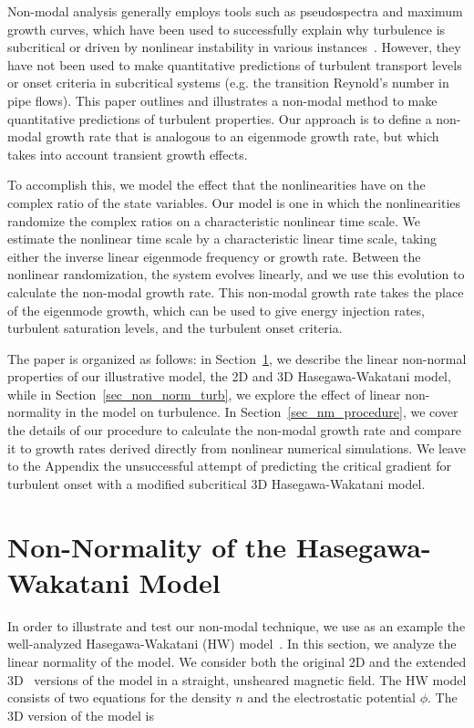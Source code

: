 \documentclass[twocolumn,showkeys,superscriptaddress]{revtex4}
\begin{document}
Non-modal analysis generally employs tools such as pseudospectra and maximum growth curves, which have been used to successfully explain
why turbulence is subcritical or driven by nonlinear instability in various instances~\cite{trefethen1993,camargo1998}. 
However, they have not been used to make quantitative predictions of turbulent transport levels or onset criteria in subcritical systems (e.g. the transition Reynold's number in pipe flows).
This paper outlines and illustrates a non-modal method to make quantitative predictions of turbulent properties. 
Our approach is to define a non-modal growth rate that is analogous to an eigenmode growth rate, but which takes into account transient growth effects. 

To accomplish this, we model the effect that the nonlinearities have on the complex ratio of the state variables. Our model is one in which the 
nonlinearities randomize the complex ratios on a characteristic nonlinear time scale.
We estimate the nonlinear time scale by a characteristic linear time scale, taking either the inverse linear eigenmode frequency or growth rate.
Between the nonlinear randomization, the system evolves linearly, and we use this evolution to calculate the non-modal growth rate. 
This non-modal growth rate takes the place of the eigenmode growth, which can be used
to give energy injection rates, turbulent saturation levels, and the turbulent onset criteria.

The paper is organized as follows: in Section~\ref{sec_hw_model}, we describe the linear non-normal properties of our illustrative model, the 2D and 3D Hasegawa-Wakatani model,
while in Section~\ref{sec_non_norm_turb}, we explore the effect of linear non-normality in the model on turbulence. 
In Section~\ref{sec_nm_procedure}, we cover the details of our procedure to calculate the non-modal growth rate and compare it to growth rates derived directly from nonlinear numerical simulations. 
We leave to the Appendix the unsuccessful attempt of predicting the critical gradient for turbulent onset with a modified subcritical 3D Hasegawa-Wakatani model.

\section{Non-Normality of the Hasegawa-Wakatani Model} 
\label{sec_hw_model}

In order to illustrate and test our non-modal technique, we use as an example the well-analyzed Hasegawa-Wakatani (HW) model~\cite{hasegawa1983}.
In this section, we analyze the linear normality of the model.
We consider both the original 2D and the extended 3D~\cite{biskamp1995} versions of the model in a straight, unsheared magnetic field. 
The HW model consists of two equations for the density $n$ and the electrostatic potential $\phi$. The 3D version of the model is
\end{document}
